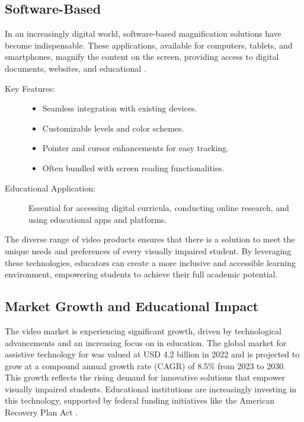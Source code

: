 \subsection{Software-Based }
In an increasingly digital world, software-based magnification solutions have become indispensable. These applications, available for computers, tablets, and smartphones, magnify the content on the screen, providing access to digital documents, websites, and educational .\supercite{BOIAScreenMagnifiers, PerkinsScreenMagnification}

\begin{description}
	\item[Key Features:]
	      \begin{itemize}
		      \item Seamless integration with existing devices.
		      \item Customizable  levels and color schemes.
		      \item Pointer and cursor enhancements for easy tracking.
		      \item Often bundled with screen reading functionalities.
	      \end{itemize}
	\item[Educational Application:] Essential for accessing digital curricula, conducting online research, and using educational apps and platforms.
\end{description}

The diverse range of video  products ensures that there is a solution to meet the unique needs and preferences of every visually impaired student. By leveraging these technologies, educators can create a more inclusive and accessible learning environment, empowering students to achieve their full academic potential.

\subsection{Market Growth and Educational Impact}
The video  market is experiencing significant growth, driven by technological advancements and an increasing focus on  in education. The global market for assistive technology for  was valued at USD 4.2 billion in 2022 and is projected to grow at a compound annual growth rate (CAGR) of 8.5\% from 2023 to 2030. This growth reflects the rising demand for innovative solutions that empower visually impaired students. Educational institutions are increasingly investing in this technology, supported by federal funding initiatives like the American Recovery Plan Act \supercite{AmericanRecoveryAct}.

